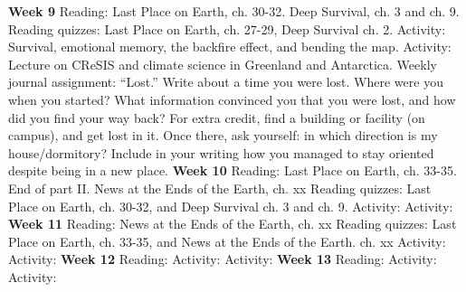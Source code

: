 \documentclass[10pt]{article}
\begin{document}
\begin{outline}[enumerate]
\1 \textbf{Week 9}
\2 Reading: Last Place on Earth, ch. 30-32. Deep Survival, ch. 3 and ch. 9.
\2 Reading quizzes: Last Place on Earth, ch. 27-29, Deep Survival ch. 2.
\2 Activity: Survival, emotional memory, the backfire effect, and bending the map.
\2 Activity: Lecture on CReSIS and climate science in Greenland and Antarctica.
\2 Weekly journal assignment: ``Lost.'' Write about a time you were lost.  Where were you when you started?  What information convinced you that you were lost, and how did you find your way back?  For extra credit, find a building or facility (on campus), and get lost in it.  Once there, ask yourself: in which direction is my house/dormitory?  Include in your writing how you managed to stay oriented despite being in a new place.
\1 \textbf{Week 10}
\2 Reading: Last Place on Earth, ch. 33-35. End of part II.  News at the Ends of the Earth, ch. xx
\2 Reading quizzes: Last Place on Earth, ch. 30-32, and Deep Survival ch. 3 and ch. 9.
\2 Activity:
\2 Activity:
\1 \textbf{Week 11}
\2 Reading:  News at the Ends of the Earth, ch. xx
\2 Reading quizzes: Last Place on Earth, ch. 33-35, and News at the Ends of the Earth. ch. xx
\2 Activity:
\2 Activity:
\1 \textbf{Week 12}
\2 Reading:
\2 Activity:
\2 Activity:
\1 \textbf{Week 13}
\2 Reading:
\2 Activity:
\2 Activity:
\end{outline}
\end{document}
